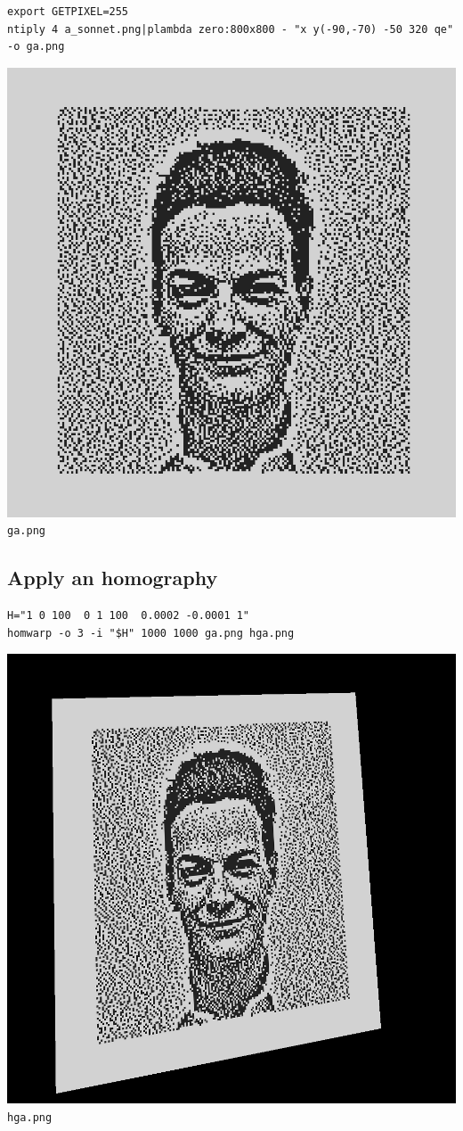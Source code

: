 \begin{verbatim}
export GETPIXEL=255
ntiply 4 a_sonnet.png|plambda zero:800x800 - "x y(-90,-70) -50 320 qe" -o ga.png
\end{verbatim}
\includegraphics{ga.png}\verb+ga.png+

\subsection{Apply an homography}
\begin{verbatim}
H="1 0 100  0 1 100  0.0002 -0.0001 1"
homwarp -o 3 -i "$H" 1000 1000 ga.png hga.png
\end{verbatim}
\includegraphics{hga.png}\verb+hga.png+

